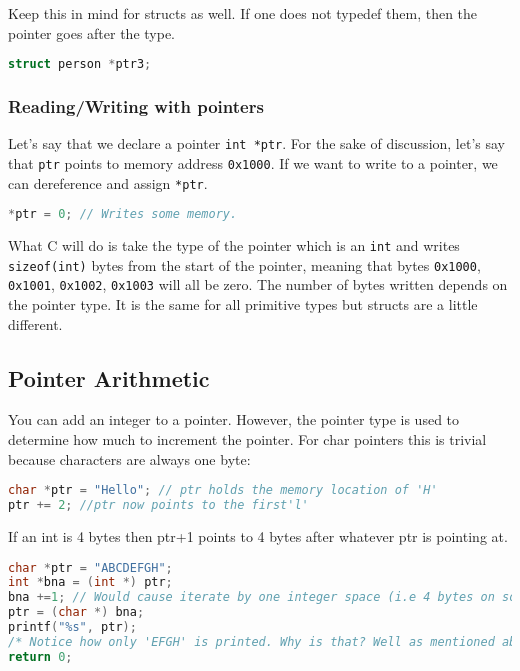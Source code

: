 Keep this in mind for structs as well. If one does not typedef them, then the pointer goes after the type.

\begin{lstlisting}[language=C]
struct person *ptr3;
\end{lstlisting}

\subsubsection{Reading/Writing with pointers}

Let's say that we declare a pointer \texttt{int\ *ptr}. For the sake of
discussion, let's say that \texttt{ptr} points to memory address
\texttt{0x1000}. If we want to write to a pointer, we can dereference
and assign \texttt{*ptr}.

\begin{lstlisting}[language=C]
*ptr = 0; // Writes some memory.
\end{lstlisting}

What C will do is take the type of the pointer which is an \texttt{int}
and writes \texttt{sizeof(int)} bytes from the start of the pointer,
meaning that bytes \texttt{0x1000}, \texttt{0x1001}, \texttt{0x1002},
\texttt{0x1003} will all be zero. The number of bytes written depends on
the pointer type. It is the same for all primitive types but structs are
a little different.

\subsection{Pointer Arithmetic}

You can add an integer to a pointer. However, the pointer type is used
to determine how much to increment the pointer. For char pointers this
is trivial because characters are always one byte:

\begin{lstlisting}[language=C]
char *ptr = "Hello"; // ptr holds the memory location of 'H'
ptr += 2; //ptr now points to the first'l'
\end{lstlisting}

If an int is 4 bytes then ptr+1 points to 4 bytes after whatever ptr is
pointing at.

\begin{lstlisting}[language=C]
char *ptr = "ABCDEFGH";
int *bna = (int *) ptr;
bna +=1; // Would cause iterate by one integer space (i.e 4 bytes on some systems)
ptr = (char *) bna;
printf("%s", ptr);
/* Notice how only 'EFGH' is printed. Why is that? Well as mentioned above, when performing 'bna+=1' we are increasing the **integer** pointer by 1, (translates to 4 bytes on most systems) which is equivalent to 4 characters (each character is only 1 byte)*/
return 0;
\end{lstlisting}

